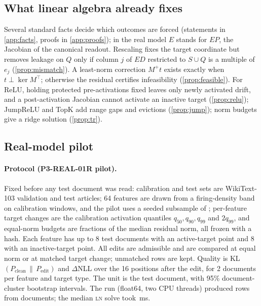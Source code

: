 \documentclass{article}
\theoremstyle{plain}
\theoremstyle{definition}
\theoremstyle{remark}
\newcommand{\LN}{\textsc{ln}}
\begin{document}
\subsection{What linear algebra already fixes}
\label{sec:analysis}
Several standard facts decide which outcomes are forced (statements in \cref{app:facts},
proofs in \cref{app:proofs}); in the real model $E$ stands for $EP$, the Jacobian of the
canonical readout. Rescaling fixes the target coordinate but removes leakage on $Q$ only if
column $j$ of $ED$ restricted to $S\cup Q$ is a multiple of $e_j$ (\cref{prop:mismatch}). A
least-norm correction $M^{+}t$ exists exactly when $t\perp\ker M^{\top}$; otherwise the
residual certifies infeasibility (\cref{prop:feasible}). For ReLU, holding protected
pre-activations fixed leaves only newly activated drift, and a post-activation Jacobian
cannot activate an inactive target (\cref{prop:relu}); JumpReLU and TopK add range gaps and
evictions (\cref{prop:jump}); norm budgets give a ridge solution (\cref{prop:tr}).

\subsection{Real-model pilot}
\label{sec:pilot}
\paragraph{Protocol (P3-REAL-01R pilot).} Fixed before any test document was read:
calibration and test sets are WikiText-103 validation and test articles; 64 features are drawn
from a firing-density band on calibration windows, and the pilot uses a seeded subsample of
\PilotFeatures; per-feature target changes are the calibration activation quantiles
$q_{50}, q_{90}, q_{99}$ and $2q_{99}$, and equal-norm budgets are fractions of the median
residual norm, all frozen with a hash. Each feature has up to 8 test documents with an
active-target point and 8 with an inactive-target point. All edits are admissible and are
compared at equal norm or at matched target change; unmatched rows are kept. Quality is
KL$(P_{\mathrm{clean}}\,\|\,P_{\mathrm{edit}})$ and $\Delta$NLL over the 16 positions after
the edit, for 2 documents per feature and target type. The unit is the test document, with
95\% document-cluster bootstrap intervals. The run (float64, two CPU threads) produced
\PilotRows{} rows from \PilotDocs{} documents; the median \LN{} solve took
\PilotSolveMs\,ms.
\end{document}
